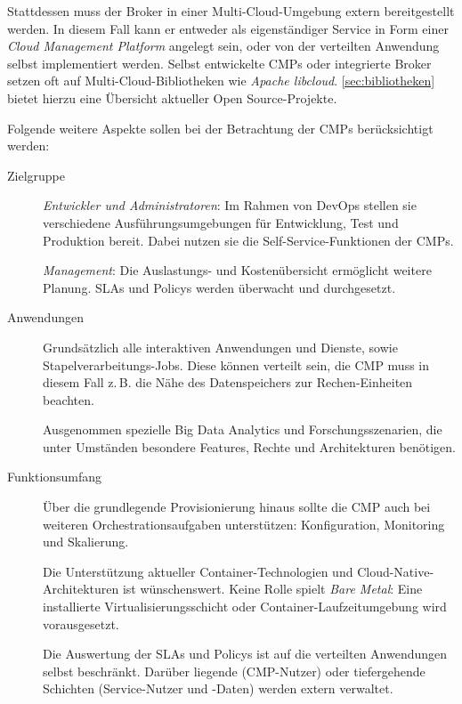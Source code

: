 Stattdessen muss der Broker in einer Multi-Cloud-Umgebung extern bereitgestellt werden. In diesem Fall kann er entweder als eigenständiger Service in Form einer \emph{Cloud Management Platform} angelegt sein, oder von der verteilten Anwendung selbst implementiert werden. Selbst entwickelte CMPs oder integrierte Broker setzen oft auf Multi-Cloud-Bibliotheken wie \emph{Apache libcloud}. \autoref{sec:bibliotheken} bietet hierzu eine Übersicht aktueller Open Source-Projekte. 

Folgende weitere Aspekte sollen bei der Betrachtung der CMPs berücksichtigt werden:

\begin{description}
	
	\item[Zielgruppe] 	\emph{Entwickler und Administratoren}: Im Rahmen von DevOps stellen sie verschiedene Ausführungsumgebungen für Entwicklung, Test und Produktion bereit. Dabei nutzen sie die Self-Service-Funktionen der CMPs.
	
						\emph{Management}: Die Auslastungs- und Kostenübersicht ermöglicht weitere Planung. SLAs und Policys werden überwacht und durchgesetzt.
	
	\item[Anwendungen] Grundsätzlich alle interaktiven Anwendungen und Dienste, sowie Stapelverarbeitungs-Jobs. Diese können verteilt sein, die CMP muss in diesem Fall z.\,B. die Nähe des Datenspeichers zur Rechen-Einheiten beachten.
	
	Ausgenommen spezielle Big Data Analytics und Forschungsszenarien, die unter Umständen besondere Features, Rechte und Architekturen benötigen.
	
	\item[Funktionsumfang] Über die grundlegende Provisionierung hinaus sollte die CMP auch bei weiteren Orchestrationsaufgaben unterstützen: Konfiguration, Monitoring und Skalierung.
	
	Die Unterstützung aktueller Container-Technologien und Cloud-Native-Architekturen ist wünschenswert. Keine Rolle spielt \emph{Bare Metal}: Eine installierte Virtualisierungsschicht oder Container-Laufzeitumgebung wird vorausgesetzt. 
	
	Die Auswertung der SLAs und Policys ist auf die verteilten Anwendungen selbst beschränkt. Darüber liegende (CMP-Nutzer) oder tiefergehende Schichten (Service-Nutzer und -Daten) werden extern verwaltet.
		
\end{description}


